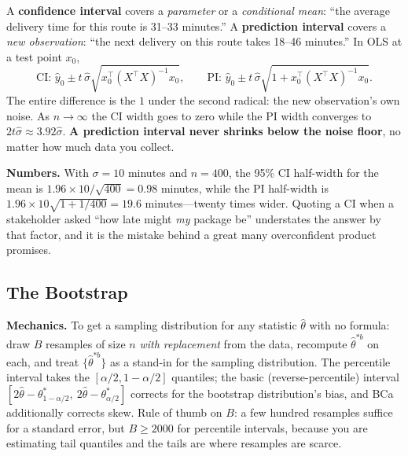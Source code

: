 \begin{keyinsight}
A \textbf{confidence interval} covers a \textit{parameter} or a \textit{conditional mean}: ``the average delivery time for this route is 31--33 minutes.'' A \textbf{prediction interval} covers a \textit{new observation}: ``the next delivery on this route takes 18--46 minutes.'' In OLS at a test point $x_0$,
\begin{equation*}
\text{CI: } \hat y_0 \pm t\,\hat\sigma\sqrt{x_0^\top (X^\top X)^{-1} x_0},
\qquad
\text{PI: } \hat y_0 \pm t\,\hat\sigma\sqrt{1 + x_0^\top (X^\top X)^{-1} x_0} .
\end{equation*}
The entire difference is the \textbf{$1$} under the second radical: the new observation's own noise. As $n \to \infty$ the CI width goes to zero while the PI width converges to $2t\hat\sigma \approx 3.92\hat\sigma$. \textbf{A prediction interval never shrinks below the noise floor}, no matter how much data you collect.
\end{keyinsight}

\textbf{Numbers.} With $\sigma = 10$ minutes and $n = 400$, the 95\% CI half-width for the mean is $1.96 \times 10/\sqrt{400} = 0.98$ minutes, while the PI half-width is $1.96 \times 10\sqrt{1 + 1/400} = 19.6$ minutes---twenty times wider. Quoting a CI when a stakeholder asked ``how late might \textit{my} package be'' understates the answer by that factor, and it is the mistake behind a great many overconfident product promises.

\subsection{The Bootstrap}

\textbf{Mechanics.} To get a sampling distribution for any statistic $\hat\theta$ with no formula: draw $B$ resamples of size $n$ \textit{with replacement} from the data, recompute $\hat\theta^{*b}$ on each, and treat $\{\hat\theta^{*b}\}$ as a stand-in for the sampling distribution. The percentile interval takes the $[\alpha/2, 1-\alpha/2]$ quantiles; the basic (reverse-percentile) interval $[2\hat\theta - \theta^*_{1-\alpha/2},\ 2\hat\theta - \theta^*_{\alpha/2}]$ corrects for the bootstrap distribution's bias, and BCa additionally corrects skew. Rule of thumb on $B$: a few hundred resamples suffice for a standard error, but $B \ge 2000$ for percentile intervals, because you are estimating tail quantiles and the tails are where resamples are scarce.


